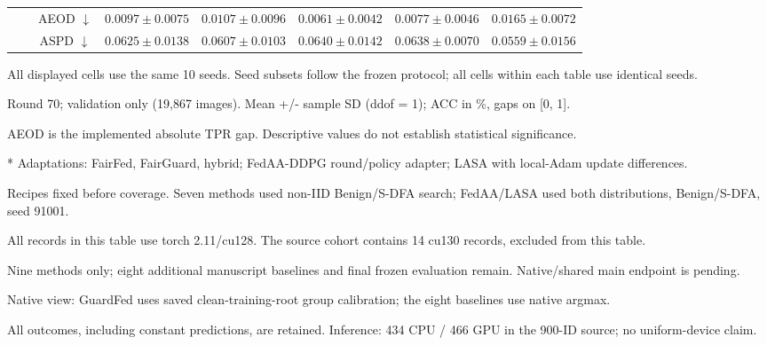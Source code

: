 \begin{table}[t]
{\begin{tabular}{l|l|c|ccccc}
 &  & AEOD $\downarrow$ & $0.0097 \pm 0.0075$ & $0.0107 \pm 0.0096$ & $0.0061 \pm 0.0042$ & $0.0077 \pm 0.0046$ & $0.0165 \pm 0.0072$ \\
 &  & ASPD $\downarrow$ & $0.0625 \pm 0.0138$ & $0.0607 \pm 0.0103$ & $0.0640 \pm 0.0142$ & $0.0638 \pm 0.0070$ & $0.0559 \pm 0.0156$ \\
\hline\hline
\end{tabular}}
\par\smallskip
\begin{minipage}{\textwidth}\scriptsize
All displayed cells use the same 10 seeds. Seed subsets follow the frozen protocol; all cells within each table use identical seeds.\par
Round 70; validation only (19,867 images). Mean +/- sample SD (ddof = 1); ACC in \%, gaps on [0, 1].\par
AEOD is the implemented absolute TPR gap. Descriptive values do not establish statistical significance.\par
* Adaptations: FairFed, FairGuard, hybrid; FedAA-DDPG round/policy adapter; LASA with local-Adam update differences.\par
Recipes fixed before coverage. Seven methods used non-IID Benign/S-DFA search; FedAA/LASA used both distributions, Benign/S-DFA, seed 91001.\par
All records in this table use torch 2.11/cu128. The source cohort contains 14 cu130 records, excluded from this table.\par
Nine methods only; eight additional manuscript baselines and final frozen evaluation remain. Native/shared main endpoint is pending.\par
Native view: GuardFed uses saved clean-training-root group calibration; the eight baselines use native argmax.\par
All outcomes, including constant predictions, are retained. Inference: 434 CPU / 466 GPU in the 900-ID source; no uniform-device claim.\par
\end{minipage}
\end{table}
